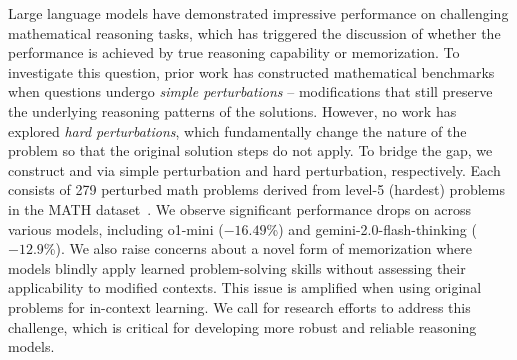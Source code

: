 Large language models have demonstrated impressive performance on challenging mathematical reasoning tasks, which has triggered the discussion of whether the performance is achieved by true reasoning capability or memorization. 
To investigate this question, prior work has constructed mathematical benchmarks when questions undergo \textit{simple perturbations} -- modifications that still preserve the underlying reasoning patterns of the solutions. However, no work has explored \textit{hard perturbations}, which fundamentally change the nature of the problem so that the original solution steps do not apply. To bridge the gap, we construct \SAME and \HARD via simple perturbation and hard perturbation, respectively. Each consists of 279 perturbed math problems derived from level-5 (hardest) problems in the MATH dataset~\citep{hendrycksmath2021}. We observe significant performance drops on \HARD across various models, including o1-mini {($-16.49$\%)} and gemini-2.0-flash-thinking ($-12.9$\%).
We also raise concerns about a novel form of memorization where models blindly apply learned problem-solving skills without assessing their applicability to modified contexts. This issue is amplified when using original problems for in-context learning. 
We call for research efforts to address this challenge, which is critical for developing more robust and reliable reasoning models.



